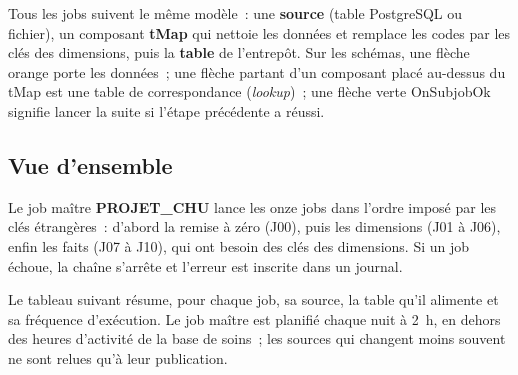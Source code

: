 \vspace{0.2cm}

\noindent Tous les jobs suivent le même modèle~: une \textbf{source} (table PostgreSQL ou fichier), un composant \textbf{tMap} qui nettoie les données et remplace les codes par les clés des dimensions, puis la \textbf{table} de l'entrepôt. Sur les schémas, une flèche orange porte les données~; une flèche partant d'un composant placé au-dessus du tMap est une table de correspondance (\textit{lookup})~; une flèche verte \og OnSubjobOk\fg{} signifie \og lancer la suite si l'étape précédente a réussi\fg{}.

\subsection{Vue d'ensemble}\label{sec:etl-ensemble}

\noindent Le job maître \textbf{PROJET\_CHU} lance les onze jobs dans l'ordre imposé par les clés étrangères~: d'abord la remise à zéro (J00), puis les dimensions (J01 à J06), enfin les faits (J07 à J10), qui ont besoin des clés des dimensions. Si un job échoue, la chaîne s'arrête et l'erreur est inscrite dans un journal.


\noindent Le tableau suivant résume, pour chaque job, sa source, la table qu'il alimente et sa fréquence d'exécution. Le job maître est planifié chaque nuit à 2~h, en dehors des heures d'activité de la base de soins~; les sources qui changent moins souvent ne sont relues qu'à leur publication.

